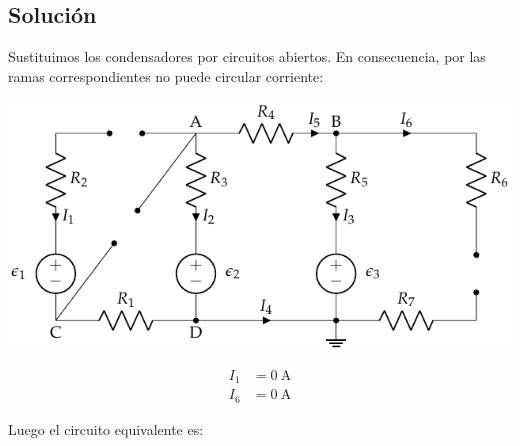 \subsection*{Solución}

Sustituimos los condensadores por circuitos abiertos. En consecuencia, por las ramas correspondientes no puede circular corriente:

\vspace{2mm}
\begin{minipage}{0.65\linewidth}
  \includegraphics[scale=1]{figuras/nudos_condensadores2.pdf}
\end{minipage}
\begin{minipage}{0.25\linewidth}
    \begin{align*}
      I_1 &= \qty{0}{\ampere}\\
      I_6 &= \qty{0}{\ampere}
    \end{align*}    
\end{minipage}

\vspace{6mm}
Luego el circuito equivalente es:

